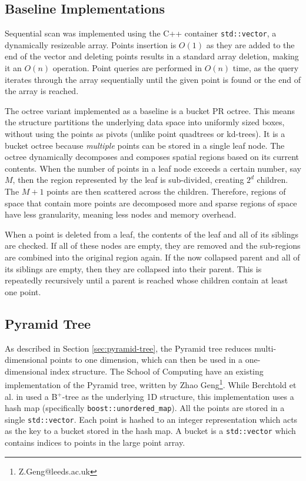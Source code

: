 \subsection{Baseline Implementations}
 
Sequential scan was implemented using the C++ container \texttt{std::vector}, a dynamically resizeable array. Points insertion is $O(1)$ as they are added to the end of the vector and deleting points results in a standard array deletion, making it an $O(n)$ operation. Point queries are performed in $O(n)$ time, as the query iterates through the array sequentially until the given point is found or the end of the array is reached.

The octree variant implemented as a baseline is a bucket PR octree. This means the structure partitions the underlying data space into uniformly sized boxes, without using the points as pivots (unlike point quadtrees or kd-trees). It is a bucket octree because \textit{multiple} points can be stored in a single leaf node. The octree dynamically decomposes and composes spatial regions based on its current contents. When the number of points in a leaf node exceeds a certain number, say $M$, then the region represented by the leaf is sub-divided, creating $2^d$ children. The $M + 1$ points are then scattered across the children. Therefore, regions of space that contain more points are decomposed more and sparse regions of space have less granularity, meaning less nodes and memory overhead.

When a point is deleted from a leaf, the contents of the leaf and all of its siblings are checked. If all of these nodes are empty, they are removed and the sub-regions are combined into the original region again. If the now collapsed parent and all of its siblings are empty, then they are collapsed into their parent. This is repeatedly recursively until a parent is reached whose children contain at least one point.

\subsection{Pyramid Tree}

As described in Section \ref{sec:pyramid-tree}, the Pyramid tree reduces multi-dimensional points to one dimension, which can then be used in a one-dimensional index structure. The School of Computing have an existing implementation of the Pyramid tree, written by Zhao Geng\footnote{Z.Geng@leeds.ac.uk}. While Berchtold et al. in \cite{pyramid-tree} used a B${}^{+}$-tree as the underlying 1D structure, this implementation uses a hash map (specifically \texttt{boost::unordered\_map}). All the points are stored in a single \texttt{std::vector}. Each point is hashed to an integer representation which acts as the key to a bucket stored in the hash map. A bucket is a \texttt{std::vector} which contains indices to points in the large point array.
 
